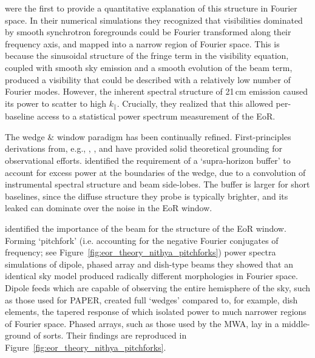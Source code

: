 \cite{Parsons.12a} were the first to provide a quantitative explanation of this structure in Fourier space. In their numerical simulations they recognized that visibilities dominated by smooth synchrotron foregrounds could be Fourier transformed along their frequency axis, and mapped into a narrow region of Fourier space. This is because the sinusoidal structure of the fringe term in the visibility equation, coupled with smooth sky emission and a smooth evolution of the beam term, produced a visibility that could be described with a relatively low number of Fourier modes. However, the inherent spectral structure of 21\,cm emission caused its power to scatter to high $k_{\parallel}$. Crucially, they realized that this allowed per-baseline access to a statistical power spectrum measurement of the EoR.

The wedge \& window paradigm has been continually refined. First-principles derivations from, e.g., \citealt{Trott.12}, \citealt{Vedantham.12}, \citealt{Hazelton.13} and \citealt{Liu.14.1, Liu.14.2} have provided solid theoretical grounding for observational efforts. \cite{Pober.13} identified the requirement of a `supra-horizon buffer' to account for excess power at the boundaries of the wedge, due to a convolution of instrumental spectral structure and beam side-lobes. The buffer is larger for short baselines, since the diffuse structure they probe is typically brighter, and its leaked can dominate over the noise in the EoR window.

\cite{Nithya.15b} identified the importance of the beam for the structure of the EoR window. Forming `pitchfork' (i.e. accounting for the negative Fourier conjugates of frequency; see Figure~\ref{fig:eor_theory_nithya_pitchforks}) power spectra simulations of dipole, phased array and dish-type beams they showed that an identical sky model produced radically different morphologies in Fourier space. Dipole feeds which are capable of observing the entire hemisphere of the sky, such as those used for PAPER, created full `wedges' compared to, for example, dish elements, the tapered response of which isolated power to much narrower regions of Fourier space. Phased arrays, such as those used by the MWA, lay in a middle-ground of sorts. Their findings are reproduced in Figure~\ref{fig:eor_theory_nithya_pitchforks}.

